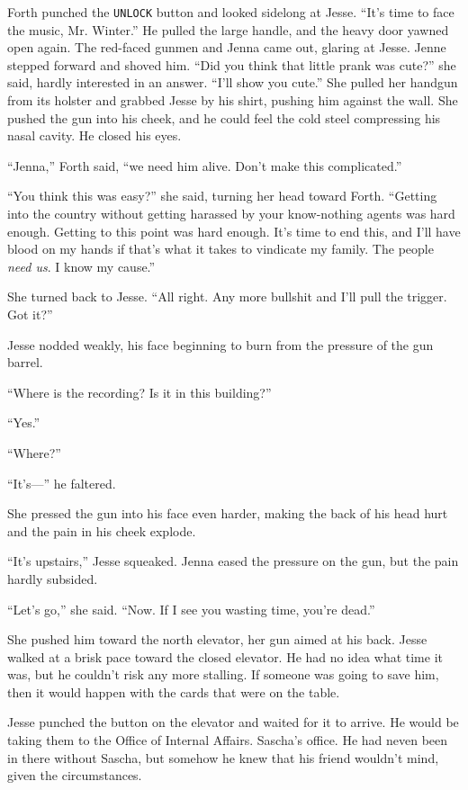 \documentclass[12pt]{book}
\begin{document}
Forth punched the \texttt{UNLOCK} button and looked sidelong at Jesse.  ``It's time to face the music, Mr. Winter.''  He pulled the large handle, and the heavy door yawned open again.  The red-faced gunmen and Jenna came out, glaring at Jesse.  Jenne stepped forward and shoved him.  ``Did you think that little prank was cute?'' she said, hardly interested in an answer.  ``I'll show you cute.''  She pulled her handgun from its holster and grabbed Jesse by his shirt, pushing him against the wall.  She pushed the gun into his cheek, and he could feel the cold steel compressing his nasal cavity.  He closed his eyes.

``Jenna,'' Forth said, ``we need him alive.  Don't make this complicated.''

``You think this was easy?'' she said, turning her head toward Forth.  ``Getting into the country without getting harassed by your know-nothing agents was hard enough.  Getting to this point was hard enough.  It's time to end this, and I'll have blood on my hands if that's what it takes to vindicate my family.  The people \emph{need us}.  I know my cause.''

She turned back to Jesse.  ``All right.  Any more bullshit and I'll pull the trigger.  Got it?''

Jesse nodded weakly, his face beginning to burn from the pressure of the gun barrel.

``Where is the recording?  Is it in this building?''

``Yes.''

``Where?''

``It's---'' he faltered.

She pressed the gun into his face even harder, making the back of his head hurt and the pain in his cheek explode.

``It's upstairs,'' Jesse squeaked.  Jenna eased the pressure on the gun, but the pain hardly subsided.

``Let's go,'' she said.  ``Now.  If I see you wasting time, you're dead.''

She pushed him toward the north elevator, her gun aimed at his back.  Jesse walked at a brisk pace toward the closed elevator.  He had no idea what time it was, but he couldn't risk any more stalling.  If someone was going to save him, then it would happen with the cards that were on the table.

Jesse punched the button on the elevator and waited for it to arrive.  He would be taking them to the Office of Internal Affairs.  Sascha's office.  He had neven been in there without Sascha, but somehow he knew that his friend wouldn't mind, given the circumstances.
\end{document}

